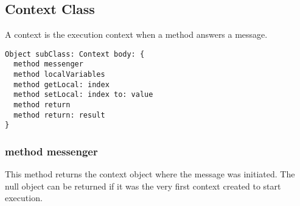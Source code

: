 \subsection {Context Class}

\indent{}A context is the execution context when a method answers a message.

\begin{lstlisting}
Object subClass: Context body: {
  method messenger
  method localVariables
  method getLocal: index
  method setLocal: index to: value
  method return
  method return: result
}
\end{lstlisting}

\subsubsection {method messenger}
\indent{}This method returns the context object where the message was
initiated. The null object can be returned if it was the very first context
created to start execution.

